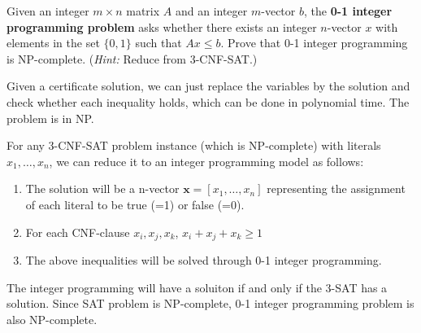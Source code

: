 \begin{exercise}[]{   Given an integer $m \times n$ matrix $A$ and an integer $m$-vector $b$, the \textbf{0-1 integer programming problem} asks whether there exists an integer $n$-vector $x$ with elements in the set $\{0, 1\}$ such that $Ax \le b$. Prove that 0-1 integer programming is NP-complete. (\textit{Hint:} Reduce from 3-CNF-SAT.)}
  \begin{solution} Given a certificate solution, we can just replace the variables by the solution and check whether each inequality holds, which can be done in polynomial time. The problem is in NP.

  For any 3-CNF-SAT problem instance (which is NP-complete) with literals $x_1,\ldots,x_n$, we can reduce it to an integer programming model as follows:
  \begin{enumerate}
    \item The solution will be a n-vector $\mathbf{x} = \left[x_1,\ldots,x_n\right]$ representing the assignment of each literal to be true (=1) or false (=0).
    \item For each CNF-clause $x_i,x_j,x_k$, $x_i + x_j + x_k \ge 1$
    \item The above inequalities will be solved through 0-1 integer programming.
  \end{enumerate}
  The integer programming will have a soluiton if and only if the 3-SAT has a solution. Since SAT problem is NP-complete, 0-1 integer programming problem is also NP-complete.
  \end{solution}
  \label{ex2}
\end{exercise}


